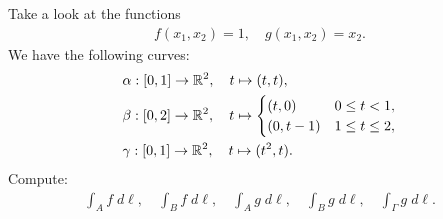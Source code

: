 \documentclass[11pt]{article}
\begin{document}
\begin{exercise}
    Take a look at the functions 
    \begin{align*}
        f(x_1,x_2) = 1, \quad g(x_1,x_2) = x_2.
    \end{align*}
    We have the following curves:
    \begin{align*}
        &\alpha : [0,1] \to \mathbb{R}^2, \quad t \mapsto (t,t),
        \\
        &\beta  : [0,2] \to \mathbb{R}^2, \quad t \mapsto \begin{cases} (t,0) & 0 \leq t < 1, \\ (0,t-1) & 1 \leq t \leq 2, \end{cases}
        \\
        &\gamma : [0,1] \to \mathbb{R}^2, \quad t \mapsto (t^2,t).
    \end{align*}
    Compute:
    \begin{align*}
        \int_A f \;d\ell, \quad \int_B f \;d\ell, \quad 
        \int_A g \;d\ell, \quad \int_B g \;d\ell, \quad 
        \int_\Gamma g \;d\ell
        .
    \end{align*}
\end{exercise}
\end{document}
